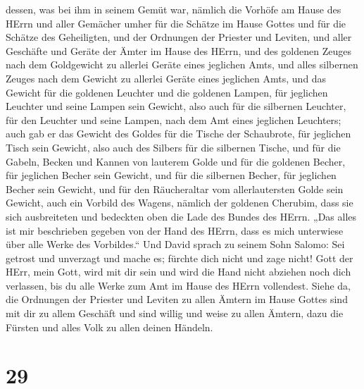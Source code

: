 dessen, was bei ihm in seinem Gemüt war, nämlich die Vorhöfe am Hause
des HErrn und aller Gemächer umher für die Schätze im Hause Gottes und
für die Schätze des Geheiligten,  und der Ordnungen der
Priester und Leviten, und aller Geschäfte und Geräte der Ämter im Hause
des HErrn,  und des goldenen Zeuges nach dem Goldgewicht
zu allerlei Geräte eines jeglichen Amts, und alles silbernen Zeuges nach
dem Gewicht zu allerlei Geräte eines jeglichen Amts,  und
das Gewicht für die goldenen Leuchter und die goldenen Lampen, für
jeglichen Leuchter und seine Lampen sein Gewicht, also auch für die
silbernen Leuchter, für den Leuchter und seine Lampen, nach dem Amt
eines jeglichen Leuchters;  auch gab er das Gewicht des
Goldes für die Tische der Schaubrote, für jeglichen Tisch sein Gewicht,
also auch des Silbers für die silbernen Tische,  und für
die Gabeln, Becken und Kannen von lauterem Golde und für die goldenen
Becher, für jeglichen Becher sein Gewicht, und für die silbernen Becher,
für jeglichen Becher sein Gewicht,  und für den
Räucheraltar vom allerlautersten Golde sein Gewicht, auch ein Vorbild
des Wagens, nämlich der goldenen Cherubim, dass sie sich ausbreiteten
und bedeckten oben die Lade des Bundes des HErrn.  „Das
alles ist mir beschrieben gegeben von der Hand des HErrn, dass es mich
unterwiese über alle Werke des Vorbildes.``  Und David
sprach zu seinem Sohn Salomo: Sei getrost und unverzagt und mache es;
fürchte dich nicht und zage nicht! Gott der HErr, mein Gott, wird mit
dir sein und wird die Hand nicht abziehen noch dich verlassen, bis du
alle Werke zum Amt im Hause des HErrn vollendest.  Siehe
da, die Ordnungen der Priester und Leviten zu allen Ämtern im Hause
Gottes sind mit dir zu allem Geschäft und sind willig und weise zu allen
Ämtern, dazu die Fürsten und alles Volk zu allen deinen Händeln.

\hypertarget{section-28}{%
\section{29}\label{section-28}}

